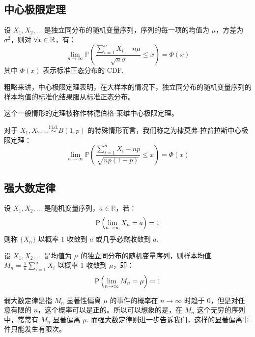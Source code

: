 \subsection{中心极限定理}

\begin{theorem}[中心极限定理]
设 $X_1,X_2,\ldots$ 是独立同分布的随机变量序列，序列的每一项的均值为 $\mu$，方差为 $\sigma^2$，则对 $\forall x\in\mathbb{R}$，有：
\[
\lim_{n\to\infty}\mathbb P\left(\frac{\sum\limits_{i=1}^nX_i-n\mu}{\sqrt n\sigma}\leq  x\right)=\Phi(x)
\]
其中 $\Phi(x)$ 表示标准正态分布的 CDF.
\end{theorem}
\begin{com}
粗略来讲，中心极限定理表明，在大样本的情况下，独立同分布的随机变量序列的样本均值的标准化结果服从标准正态分布。
\end{com}

\begin{com}
这个一般情形的定理被称作林德伯格-莱维中心极限定理。
\end{com}

\begin{com}
对于 $X_1,X_2,\ldots\overset{\text{i.i.d.}}{\sim} B(1,p)$ 的特殊情形而言，我们称之为棣莫弗-拉普拉斯中心极限定理：
\[
\lim_{n\to\infty}\mathbb P\left(\frac{\sum\limits_{i=1}^nX_i-np}{\sqrt{np(1-p)}}\leq x\right)=\Phi(x)
\]
\end{com}


\subsection{强大数定律}

\begin{definition}
设 $X_1,X_2,\ldots$ 是随机变量序列，$a\in\mathbb R$，若：
\[
\mathrm{P}\left(\lim_{n\to\infty}X_n=a\right)=1
\]
则称 $\{X_n\}$ 以概率 1 收敛到 $a$ 或几乎必然收敛到 $a$.
\end{definition}

\begin{theorem}[强大数定律]
设 $X_1,X_2,\ldots$ 是均值为 $\mu$ 的独立同分布的随机变量序列，则样本均值 $M_n=\frac{1}{n}\sum_{i=1}^nX_i$ 以概率 1 收敛到 $\mu$，即：
\[
\mathrm{P}\left(\lim_{n\to\infty}M_n=\mu\right)=1
\]
\end{theorem}

\begin{com}
弱大数定律是指 $M_n$ 显著性偏离 $\mu$ 的事件的概率在 $n\to\infty$ 时趋于 0，但是对任意有限的 $n$，这个概率可以是正的。所以可以想象的是，在 $M_n$ 这个无穷的序列中，常常有 $M_n$ 显著偏离 $\mu$. 而强大数定律则进一步告诉我们，这样的显著偏离事件只能发生有限次。
\end{com}

